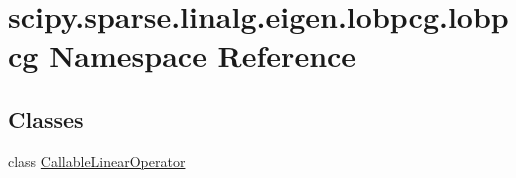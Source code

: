 \hypertarget{namespacescipy_1_1sparse_1_1linalg_1_1eigen_1_1lobpcg_1_1lobpcg}{}\section{scipy.\+sparse.\+linalg.\+eigen.\+lobpcg.\+lobpcg Namespace Reference}
\label{namespacescipy_1_1sparse_1_1linalg_1_1eigen_1_1lobpcg_1_1lobpcg}
\subsection*{Classes}
\begin{DoxyCompactItemize}
\item 
class \hyperlink{classscipy_1_1sparse_1_1linalg_1_1eigen_1_1lobpcg_1_1lobpcg_1_1CallableLinearOperator}{Callable\+Linear\+Operator}
\end{DoxyCompactItemize}
